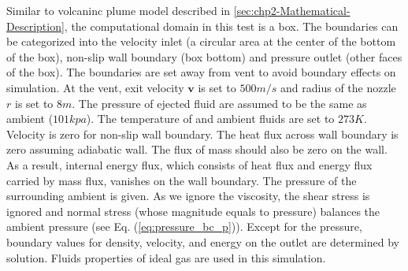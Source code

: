 Similar to volcaninc plume model described in \ref{sec:chp2-Mathematical-Description}, the computational domain in this test is a box. The boundaries can be categorized into the velocity inlet (a circular area at the center of the bottom of the box), non-slip wall boundary (box bottom) and pressure outlet (other faces of the box). The boundaries are set away from vent to avoid boundary effects on simulation.
At the vent, exit velocity $\textbf{v}$ is set to $500 m / s$ and radius of the nozzle $r$ is set to $8m $. The pressure of ejected fluid are assumed to be the same as ambient ($101 kpa$). The temperature of and ambient fluids are set to $273 K$. 
Velocity is zero for non-slip wall boundary. The heat flux across wall boundary is zero assuming adiabatic wall. The flux of mass should also be zero on the wall. As a result, internal energy flux, which consists of heat flux and energy flux carried by mass flux, vanishes on the wall boundary. 
The pressure of the surrounding ambient is given. As we ignore the viscosity, the shear stress is ignored and normal stress (whose magnitude equals to pressure) balances the ambient pressure (see Eq. (\ref{eq:pressure_bc_p})).
Except for the pressure, boundary values for density, velocity, and energy on the outlet are determined by solution. Fluids properties of ideal gas are used in this simulation.

